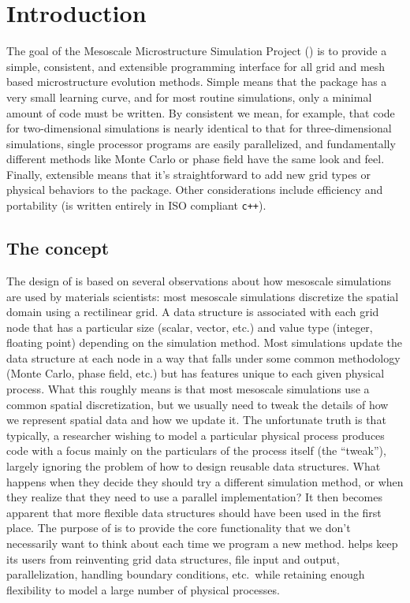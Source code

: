 
\chapter{Introduction}
The goal of the Mesoscale Microstructure Simulation Project (\MMSP) is to provide a simple, consistent, and extensible programming interface for all grid and mesh based microstructure evolution methods. Simple means that the package has a very small learning curve, and for most routine simulations, only a minimal amount of code must be written. By consistent we mean, for example, that code for two-dimensional simulations is nearly identical to that for three-dimensional simulations, single processor programs are easily parallelized, and fundamentally different methods like Monte Carlo or phase field have the same look and feel. Finally, extensible means that it's straightforward to add new grid types or physical behaviors to the package. Other considerations include efficiency and portability (\MMSP is written entirely in ISO compliant {\tt c++}).

\section{The \MMSP concept}
The design of \MMSP is based on several observations about how mesoscale simulations are used by materials scientists: most mesoscale simulations discretize the spatial domain using a rectilinear grid. A data structure is associated with each grid node that has a particular size (scalar, vector, etc.) and value type (integer, floating point) depending on the simulation method. Most simulations update the data structure at each node in a way that falls under some common methodology (Monte Carlo, phase field, etc.) but has features unique to each given physical process.  What this roughly means is that most mesoscale simulations use a common spatial discretization, but we usually need to tweak the details of how we represent spatial data and how we update it. The unfortunate truth is that typically, a researcher wishing to model a particular physical process produces code with a focus mainly on the particulars of the process itself (the ``tweak''), largely ignoring the problem of how to design reusable data structures. What happens when they decide they should try a different simulation method, or when they realize that they need to use a parallel implementation?  It then becomes apparent that more flexible data structures should have been used in the first place.  The purpose of \MMSP is to provide the core functionality that we don't necessarily want to think about each time we program a new method.  \MMSP helps keep its users from reinventing grid data structures, file input and output, parallelization, handling boundary conditions, etc.\ while retaining enough flexibility to model a large number of physical processes.

